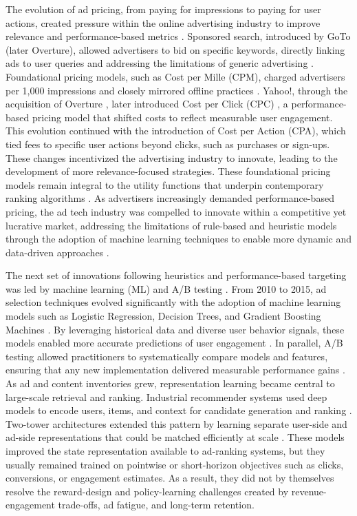 \documentclass[manuscript,review,screen]{acmart}
\begin{document}
The evolution of ad pricing, from paying for impressions to paying for user actions, created pressure within the online advertising industry to improve relevance and performance-based metrics \cite{hu2004performance}. Sponsored search, introduced by GoTo (later Overture), allowed advertisers to bid on specific keywords, directly linking ads to user queries and addressing the limitations of generic advertising  \cite{fain2006sponsored}. Foundational pricing models, such as Cost per Mille (CPM), charged advertisers per 1,000 impressions and closely mirrored offline practices \cite{hu2004performance}. Yahoo!, through the acquisition of Overture \cite{wsj2003yahoooverture}, later introduced Cost per Click (CPC) \cite{ellam2003overture}, a performance-based pricing model that shifted costs to reflect measurable user engagement. This evolution continued with the introduction of Cost per Action (CPA), which tied fees to specific user actions beyond clicks, such as purchases or sign-ups. These changes incentivized the advertising industry to innovate, leading to the development of more relevance-focused strategies. These foundational pricing models remain integral to the utility functions that underpin contemporary ranking algorithms \cite{fain2006sponsored}. As advertisers increasingly demanded performance-based pricing, the ad tech industry was compelled to innovate within a competitive yet lucrative market, addressing the limitations of rule-based and heuristic models through the adoption of machine learning techniques to enable more dynamic and data-driven approaches \cite{zhang2018whole}.

The next set of innovations following heuristics and performance-based targeting was led by machine learning (ML) and A/B testing \cite{barajas2022online}. From 2010 to 2015, ad selection techniques evolved significantly with the adoption of machine learning models such as Logistic Regression, Decision Trees, and Gradient Boosting Machines \cite{cui2015global}. By leveraging historical data and diverse user behavior signals, these models enabled more accurate predictions of user engagement \cite{cui2015global}. In parallel, A/B testing allowed practitioners to systematically compare models and features, ensuring that any new implementation delivered measurable performance gains \cite{barajas2022online}. As ad and content inventories grew, representation learning became central to large-scale retrieval and ranking. Industrial recommender systems used deep models to encode users, items, and context for candidate generation and ranking \cite{covington2016deep, cheng2016wide}. Two-tower architectures extended this pattern by learning separate user-side and ad-side representations that could be matched efficiently at scale \cite{vorotilov2023scaling}. These models improved the state representation available to ad-ranking systems, but they usually remained trained on pointwise or short-horizon objectives such as clicks, conversions, or engagement estimates. As a result, they did not by themselves resolve the reward-design and policy-learning challenges created by revenue-engagement trade-offs, ad fatigue, and long-term retention.
\end{document}
